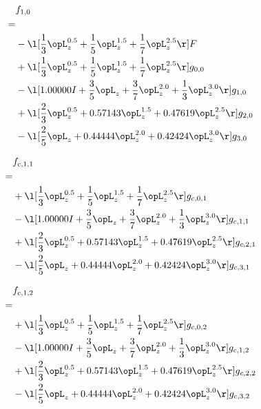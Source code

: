 \begin{alignat}{2} 
\label{eq:f_10_0} 
& f_{1,0} \nonumber \\ 
 = \\ 
& - \l[ \frac{1}{3} \opL_z^{0.5} + \frac{1}{5} \opL_z^{1.5} + \frac{1}{7} \opL_z^{2.5}  \r] F \nonumber \\ 
& + \l[ \frac{1}{3} \opL_z^{0.5} + \frac{1}{5} \opL_z^{1.5} + \frac{1}{7} \opL_z^{2.5}  \r] g_{0,0} \nonumber \\ 
& - \l[  1.00000 I + \frac{3}{5} \opL_z + \frac{3}{7} \opL_z^{2.0} + \frac{1}{3} \opL_z^{3.0}  \r] g_{1,0} \nonumber \\ 
& + \l[ \frac{2}{3} \opL_z^{0.5} +  0.57143 \opL_z^{1.5} +  0.47619 \opL_z^{2.5}  \r] g_{2,0} \nonumber \\ 
& - \l[ \frac{2}{5} \opL_z +  0.44444 \opL_z^{2.0} +  0.42424 \opL_z^{3.0}  \r] g_{3,0} \nonumber \\ 
\end{alignat} 


\begin{alignat}{2} 
\label{eq:f_11_0} 
& f_{c,1,1} \nonumber \\ 
 = \\ 
& + \l[ \frac{1}{3} \opL_z^{0.5} + \frac{1}{5} \opL_z^{1.5} + \frac{1}{7} \opL_z^{2.5}  \r] g_{c,0,1} \nonumber \\ 
& - \l[  1.00000 I + \frac{3}{5} \opL_z + \frac{3}{7} \opL_z^{2.0} + \frac{1}{3} \opL_z^{3.0}  \r] g_{c,1,1} \nonumber \\ 
& + \l[ \frac{2}{3} \opL_z^{0.5} +  0.57143 \opL_z^{1.5} +  0.47619 \opL_z^{2.5}  \r] g_{c,2,1} \nonumber \\ 
& - \l[ \frac{2}{5} \opL_z +  0.44444 \opL_z^{2.0} +  0.42424 \opL_z^{3.0}  \r] g_{c,3,1} \nonumber \\ 
\end{alignat} 


\begin{alignat}{2} 
\label{eq:f_12_0} 
& f_{c,1,2} \nonumber \\ 
 = \\ 
& + \l[ \frac{1}{3} \opL_z^{0.5} + \frac{1}{5} \opL_z^{1.5} + \frac{1}{7} \opL_z^{2.5}  \r] g_{c,0,2} \nonumber \\ 
& - \l[  1.00000 I + \frac{3}{5} \opL_z + \frac{3}{7} \opL_z^{2.0} + \frac{1}{3} \opL_z^{3.0}  \r] g_{c,1,2} \nonumber \\ 
& + \l[ \frac{2}{3} \opL_z^{0.5} +  0.57143 \opL_z^{1.5} +  0.47619 \opL_z^{2.5}  \r] g_{c,2,2} \nonumber \\ 
& - \l[ \frac{2}{5} \opL_z +  0.44444 \opL_z^{2.0} +  0.42424 \opL_z^{3.0}  \r] g_{c,3,2} \nonumber \\ 
\end{alignat} 



